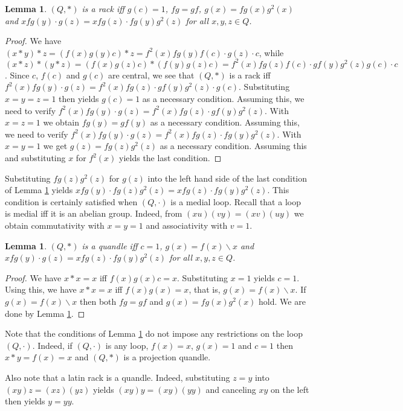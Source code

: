 \documentclass{amsart}
\def\ldiv{\backslash}
\theoremstyle{plain}
\newtheorem{lemma}[theorem]{Lemma}
\theoremstyle{definition}
\begin{document}
\begin{lemma}\label{Lm:AffineRack}
$(Q,*)$ is a rack iff $g(c)=1$, $fg=gf$, $g(x)=fg(x)g^2(x)$ and $xfg(y)\cdot g(z) = xfg(z)\cdot fg(y)g^2(z)$ for all $x,y,z\in Q$.
\end{lemma}
\begin{proof}
We have $(x*y)*z = (f(x)g(y)c)*z = f^2(x)fg(y)f(c)\cdot g(z)\cdot c$, while $(x*z)*(y*z) = (f(x)g(z)c)*(f(y)g(z)c) = f^2(x)fg(z)f(c)\cdot gf(y)g^2(z)g(c)\cdot c$. Since $c$, $f(c)$ and $g(c)$ are central, we see that $(Q,*)$ is a rack iff $f^2(x)fg(y)\cdot g(z) = f^2(x)fg(z)\cdot gf(y)g^2(z)\cdot g(c)$. Substituting $x=y=z=1$ then yields $g(c)=1$ as a necessary condition. Assuming this, we need to verify $f^2(x)fg(y)\cdot g(z) = f^2(x)fg(z)\cdot gf(y)g^2(z)$. With $x=z=1$ we obtain $fg(y) = gf(y)$ as a necessary condition. Assuming this, we need to verify $f^2(x)fg(y)\cdot g(z) = f^2(x)fg(z)\cdot fg(y)g^2(z)$. With $x=y=1$ we get $g(z)=fg(z)g^2(z)$ as a necessary condition. Assuming this and substituting $x$ for $f^2(x)$ yields the last condition.
\end{proof}

Substituting $fg(z)g^2(z)$ for $g(z)$ into the left hand side of the last condition of Lemma \ref{Lm:AffineRack} yields $xfg(y)\cdot fg(z)g^2(z) = xfg(z)\cdot fg(y)g^2(z)$. This condition is certainly satisfied when $(Q,\cdot)$ is a medial loop. Recall that a loop is medial iff it is an abelian group. Indeed, from $(xu)(vy)= (xv)(uy)$ we obtain commutativity with $x=y=1$ and associativity with $v=1$.

\begin{lemma}\label{Lm:AffineQuandle}
$(Q,*)$ is a quandle iff $c=1$, $g(x)=f(x)\ldiv x$ and $xfg(y)\cdot g(z) = xfg(z)\cdot fg(y)g^2(z)$ for all $x,y,z\in Q$.
\end{lemma}
\begin{proof}
We have $x*x=x$ iff $f(x)g(x)c=x$. Substituting $x=1$ yields $c=1$. Using this, we have $x*x=x$ iff $f(x)g(x)=x$, that is, $g(x)=f(x)\ldiv x$. If $g(x)=f(x)\ldiv x$ then both $fg=gf$ and $g(x)=fg(x)g^2(x)$ hold. We are done by Lemma \ref{Lm:AffineRack}.
\end{proof}

Note that the conditions of Lemma \ref{Lm:AffineQuandle} do not impose any restrictions on the loop $(Q,\cdot)$. Indeed, if $(Q,\cdot)$ is any loop, $f(x)=x$, $g(x)=1$ and $c=1$ then $x*y=f(x) = x$ and $(Q,*)$ is a projection quandle.

Also note that a latin rack is a quandle. Indeed, substituting $z=y$ into $(xy)z=(xz)(yz)$ yields $(xy)y = (xy)(yy)$ and canceling $xy$ on the left then yields $y=yy$.
\end{document}
